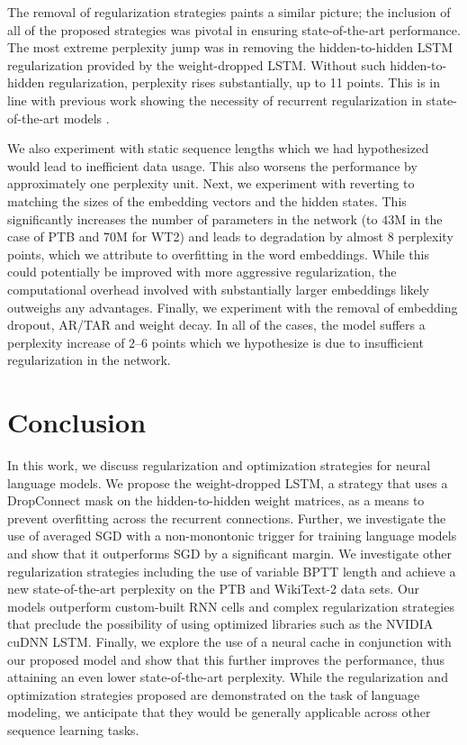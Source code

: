 \documentclass{article}
\begin{document}
The removal of regularization strategies paints a similar picture; the inclusion of all of the proposed strategies was pivotal in ensuring state-of-the-art performance.
The most extreme perplexity jump was in removing the hidden-to-hidden LSTM regularization provided by the weight-dropped LSTM.
Without such hidden-to-hidden regularization, perplexity rises substantially, up to 11 points.
This is in line with previous work showing the necessity of recurrent regularization in state-of-the-art models \citep{Gal2016ATG,Inan2016}.

We also experiment with static sequence lengths which we had hypothesized would lead to inefficient data usage.
This also worsens the performance by approximately one perplexity unit. Next, we experiment with reverting to matching the sizes of the embedding vectors and the hidden states.
This significantly increases the number of parameters in the network (to $43$M in the case of PTB and $70$M for WT2) and leads to degradation by almost $8$ perplexity points, which we attribute to overfitting in the word embeddings.
While this could potentially be improved with more aggressive regularization, the computational overhead involved with substantially larger embeddings likely outweighs any advantages.
Finally, we experiment with the removal of embedding dropout, AR/TAR and weight decay. In all of the cases, the model suffers a perplexity increase of $2$--$6$ points which we hypothesize is due to insufficient regularization in the network.

\section{Conclusion}

In this work, we discuss regularization and optimization strategies for neural language models. We propose the weight-dropped LSTM, a strategy that uses a DropConnect mask on the hidden-to-hidden weight matrices, as a means to prevent overfitting across the recurrent connections. Further, we investigate the use of averaged SGD with a non-monontonic trigger for training language models and show that it outperforms SGD by a significant margin. We investigate other regularization strategies including the use of variable BPTT length and achieve a new state-of-the-art perplexity on the PTB and WikiText-2 data sets. Our models outperform custom-built RNN cells and complex regularization strategies that preclude the possibility of using optimized libraries such as the NVIDIA cuDNN LSTM. Finally, we explore the use of a neural cache in conjunction with our proposed model and show that this further improves the performance, thus attaining an even lower state-of-the-art perplexity.
While the regularization and optimization strategies proposed are demonstrated on the task of language modeling, we anticipate that they would be generally applicable across other sequence learning tasks.











\end{document}
